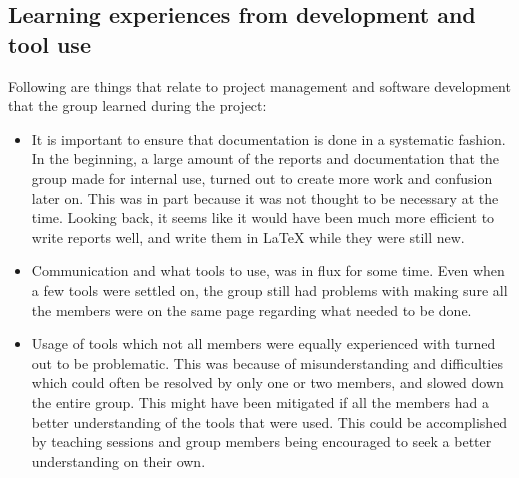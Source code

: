 \subsection{Learning experiences from development and tool use}
Following are things that relate to project management and software development that the group learned during the project:
\begin{itemize}
 \item  It is important to ensure that documentation is done in a systematic fashion. In the beginning, a large amount of the reports and documentation that the group made for internal use, turned out to create more work and confusion later on. This was in part because it was not thought to be necessary at the time. Looking back, it seems like it would have been much more efficient to write reports well, and write them in LaTeX  while they were still new.
 \item Communication and what tools to use, was in flux for some time. Even when a few tools were settled on, the group still had problems with making sure all the members were on the same page regarding what needed to be done. 
 \item  Usage of tools which not all members were equally experienced with turned out to be problematic. This was because of misunderstanding and difficulties which could often be resolved by only one or two members, and slowed down the entire group. This might have been mitigated if all the members had a better understanding of the tools that were used. This could be accomplished by teaching sessions and group members being encouraged to seek a better understanding on their own.
 \end{itemize} 
 